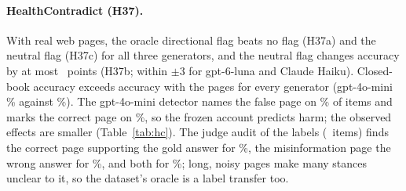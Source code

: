 \paragraph{HealthContradict (H37).} With real web pages, the oracle directional flag beats no flag (H37a) and the
neutral flag (H37c) for all three generators, and the neutral flag changes accuracy by at most \ahcNeuMini\ points (H37b;
within $\pm$3 for gpt-6-luna and Claude Haiku). Closed-book accuracy exceeds accuracy with the pages for every
generator (gpt-4o-mini \hcCbMini\% against \hcPlainMini\%). The gpt-4o-mini detector names the false page on
\hcLlmRightMini\% of items and marks the correct page on \hcLlmWrongMini\%, so the frozen account predicts harm; the
observed effects are smaller (Table~\ref{tab:hc}). The judge audit of the labels (\hcLabN\ items) finds the correct page
supporting the gold answer for \hcLabCorrect\%, the misinformation page the wrong answer for \hcLabMis\%, and both for
\hcLabBoth\%; long, noisy pages make many stances unclear to it, so the dataset's oracle is a label transfer too.
